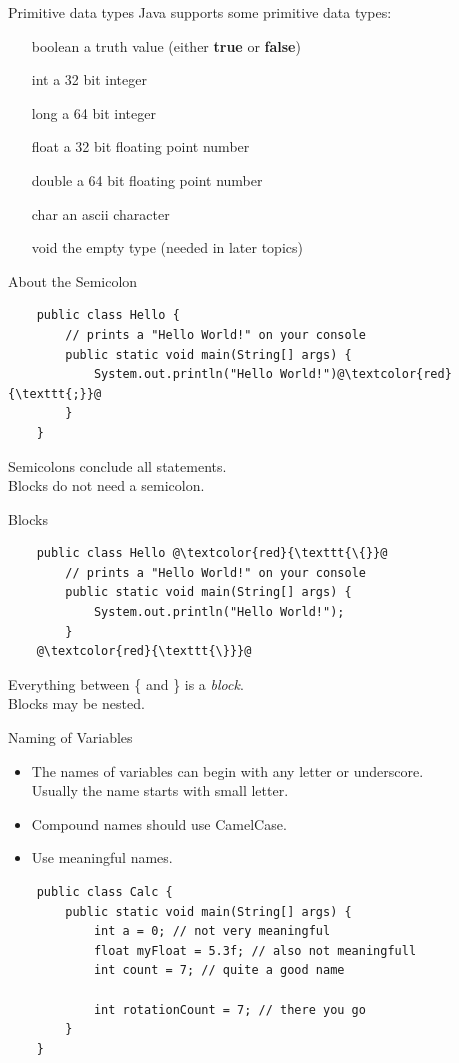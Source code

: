 \begin{frame}{Primitive data types}
	Java supports some primitive data types:
	\begin{itemize}
		\item[boolean] a truth value (either \textbf{true} or \textbf{false})
		\item[int] a 32 bit integer
		\item[long] a 64 bit integer
		\item[float] a 32 bit floating point number
		\item[double] a 64 bit floating point number
		\item[char] an ascii character
		\item[void] the empty type (needed in later topics)
	\end{itemize}
\end{frame}

\begin{frame}[fragile]{About the Semicolon}
	\begin{lstlisting}
	public class Hello {
	    // prints a "Hello World!" on your console
	    public static void main(String[] args) {
	        System.out.println("Hello World!")@\textcolor{red}{\texttt{;}}@
	    }
	}
	\end{lstlisting}
	Semicolons conclude all statements. \\
	Blocks do not need a semicolon.
\end{frame}

\begin{frame}[fragile]{Blocks}
	\begin{lstlisting}
	public class Hello @\textcolor{red}{\texttt{\{}}@
	    // prints a "Hello World!" on your console
	    public static void main(String[] args) {
	        System.out.println("Hello World!");
	    }
	@\textcolor{red}{\texttt{\}}}@
	\end{lstlisting}
	Everything between \{ and \} is a \emph{block}. \\
	Blocks may be nested.
\end{frame}

\begin{frame}[fragile]{Naming of Variables}
	\begin{itemize}
		\item The names of variables can begin with any letter or underscore. \\
		Usually the name starts with small letter.
		\item Compound names should use CamelCase.
		\item Use meaningful names.
	\end{itemize}
	\begin{lstlisting}
	public class Calc {
	    public static void main(String[] args) {
	    	int a = 0; // not very meaningful
	    	float myFloat = 5.3f; // also not meaningfull
	    	int count = 7; // quite a good name
	    	
	    	int rotationCount = 7; // there you go
	    }
	}
	\end{lstlisting}
\end{frame}

